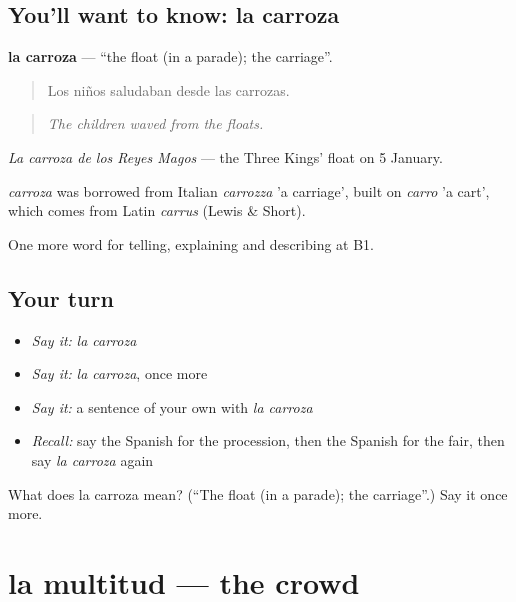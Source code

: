 \subsection*{You'll want to know: la carroza}
\textbf{la carroza} — \textquotedblleft{}the float (in a parade); the carriage\textquotedblright{}.

\begin{quote}
Los niños saludaban desde las carrozas.
\end{quote}

\begin{quote}
\emph{The children waved from the floats.}
\end{quote}

\emph{La carroza de los Reyes Magos} — the Three Kings' float on 5 January.

\begin{cousinweb}
\emph{carroza} was borrowed from Italian \emph{carrozza} 'a carriage', built on \emph{carro} 'a cart', which comes from Latin \emph{carrus} (Lewis \& Short).
\end{cousinweb}

\begin{grammarlens}[title={What you've built}]
One more word for telling, explaining and describing at B1.
\end{grammarlens}

\subsection*{Your turn}
\begin{itemize}
\raggedright
  \item \emph{Say it:} \emph{la carroza}
  \item \emph{Say it:} \emph{la carroza}, once more
  \item \emph{Say it:} a sentence of your own with \emph{la carroza}
  \item \emph{Recall:} say the Spanish for the procession, then the Spanish for the fair, then say \emph{la carroza} again
\end{itemize}

\begin{tcolorbox}[breakable,colback=teal!4,colframe=teal!35!black,title={Before you move on}]
What does la carroza mean? (\textquotedblleft{}The float (in a parade); the carriage\textquotedblright{}.) Say it once more.
\end{tcolorbox}
\section[la multitud]{la multitud — the crowd}

